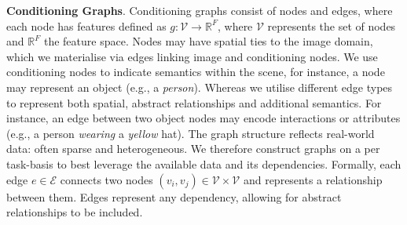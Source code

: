 \textbf{Conditioning Graphs}. Conditioning graphs consist of nodes and edges, where each node has features defined as $ g : \mathcal{V} \to \mathbb{R}^F$, where $\mathcal{V}$ represents the set of nodes and $\mathbb{R}^F$ the feature space. Nodes may have spatial ties to the image domain, which we materialise via edges linking image and conditioning nodes. We use conditioning nodes to indicate semantics within the scene, for instance, a node may represent an object (e.g., a \textit{person}). Whereas we utilise different edge types to represent both spatial, abstract relationships and additional semantics. For instance, an edge between two object nodes may encode interactions or attributes (e.g., a person \textit{wearing} a {\textit{yellow}} hat). The graph structure reflects real-world data: often sparse and heterogeneous. We therefore construct graphs on a per task-basis to best leverage the available data and its dependencies.
Formally, each edge \( e \in \mathcal{E} \) connects two nodes \( (v_i, v_j) \in \mathcal{V} \times \mathcal{V} \) and represents a relationship between them. Edges represent any dependency, allowing for abstract relationships to be included.



